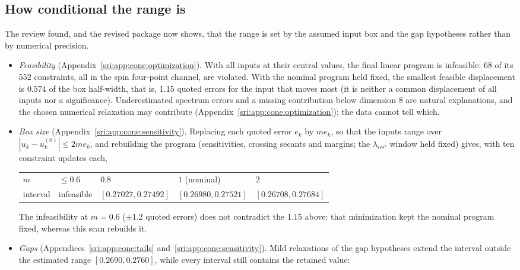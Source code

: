 \subsection{How conditional the range is}\label{sri:sec:howcond}
The review found, and the revised package now shows, that the range is set by the assumed input box and the gap
hypotheses rather than by numerical precision.
\begin{itemize}
\item \emph{Feasibility} (Appendix~\ref{sri:app:cone:optimization}). With all inputs at their central values, the final
 linear program is infeasible: 68 of
 its 552 constraints, all in the spin four-point channel, are violated. With the nominal program held fixed, the
 smallest feasible displacement is $0.574$ of the box half-width, that is, 1.15 quoted errors for the input that moves
 most (it is neither a common displacement of all inputs nor a significance). Underestimated spectrum errors and
 a missing contribution below dimension 8 are natural explanations, and the chosen numerical relaxation may contribute
 (Appendix~\ref{sri:app:cone:optimization}); the data cannot tell which.
\item \emph{Box size} (Appendix~\ref{sri:app:cone:sensitivity}). Replacing each quoted error $e_k$ by $me_k$, so that the inputs range over
 $|u_k-u_k^{(0)}|\le2me_k$, and rebuilding the program (sensitivities, crossing secants and margins; the
 $\lambda_{\epsilon\epsilon\epsilon'}$ window held fixed) gives, with ten constraint updates each,
\begin{center}\small
\begin{tabular}{@{}lllll@{}}
\toprule
$m$ & $\le0.6$ & $0.8$ & $1$ (nominal) & $2$\\
interval & infeasible & $[0.27027,0.27492]$ & $[0.26980,0.27521]$ & $[0.26708,0.27684]$\\
\bottomrule
\end{tabular}
\end{center}
 The infeasibility at $m=0.6$ ($\pm1.2$ quoted errors) does not contradict the 1.15 above: that minimization kept the
 nominal program fixed, whereas this scan rebuilds it.
\item \emph{Gaps} (Appendices~\ref{sri:app:cone:tails} and~\ref{sri:app:cone:sensitivity}). Mild relaxations of the gap hypotheses extend the interval outside the estimated range
 $[0.2690,0.2760]$, while every interval still contains the retained value:
\begin{center}\small
\begin{tabular}{@{}lllll@{}}

\end{tabular}
\end{center}
\end{itemize}
